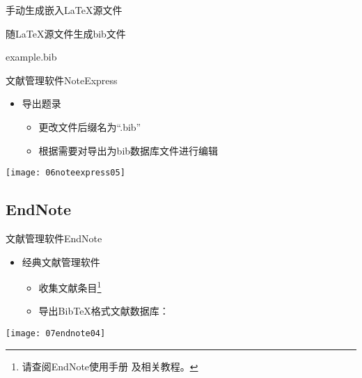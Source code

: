 \documentclass[fontset = none, t]{ctexbeamer}
\begin{document}
\begin{frame}[fragile]{手动生成}{嵌入\LaTeX 源文件}
\begin{spacing}{1.3}
\begin{center}
\begin{minipage}[h]{0.55\linewidth}
\begin{textcb}{随\LaTeX 源文件生成bib文件}
\begin{filecontents}{example.bib}
\begin{frame}[fragile]{文献管理软件}{NoteExpress}
  \begin{spacing}{1.2}
    \begin{itemize}
    \item 导出题录
      \begin{itemize}
      \item 更改文件后缀名为\enquote{.bib}
      \item 根据需要对导出为bib数据库文件进行编辑
      \end{itemize}
    \end{itemize}    
    \begin{center}
      \texttt{[image: 06noteexpress05]}
    \end{center}
  \end{spacing}
\end{frame}
\subsection[EndNote]{EndNote}
\begin{frame}[fragile]{文献管理软件}{EndNote}
  \begin{spacing}{1.5}
    \begin{itemize}
    \item 经典文献管理软件
      \begin{itemize}
      \item 收集文献条目\footnote[frame, 2]{请查阅EndNote使用手册
          及相关教程。}
      \item 导出Bib\TeX 格式文献数据库：
      \end{itemize}
    \end{itemize}    
    \begin{center}
      \texttt{[image: 07endnote04]}
    \end{center}
  \end{spacing}
\end{frame}


\end{filecontents}
\end{textcb}
\end{minipage}
\end{center}
\end{spacing}
\end{frame}
\end{document}
